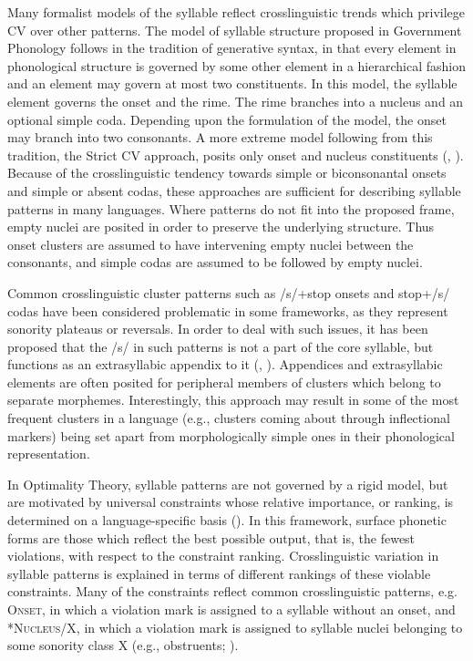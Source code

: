   Many formalist models of the syllable reflect crosslinguistic trends which privilege CV over other patterns. The model of syllable structure proposed in Government Phonology \citep{KayeEtAl1990} follows in the tradition of generative syntax, in that every element in phonological structure is governed by some other element in a hierarchical fashion and an element may govern at most two constituents. In this model, the syllable element governs the onset and the rime. The rime branches into a nucleus and an optional simple coda. Depending upon the formulation of the model, the onset may branch into two consonants. A more extreme model following from this tradition, the Strict CV approach, posits only onset and nucleus constituents (\citealt{Lowenstamm1996}, \citealt{Scheer2004}). Because of the crosslinguistic tendency towards simple or biconsonantal onsets and simple or absent codas, these approaches are sufficient for describing syllable patterns in many languages. Where patterns do not fit into the proposed frame, empty nuclei are posited in order to preserve the underlying structure. Thus onset clusters are assumed to have intervening empty nuclei between the consonants, and simple codas are assumed to be followed by empty nuclei.



  Common crosslinguistic cluster patterns such as /s/+stop onsets and stop+/s/ codas have been considered problematic in some frameworks, as they represent sonority plateaus or reversals. In order to deal with such issues, it has been proposed that the /s/ in such patterns is not a part of the core syllable, but functions as an extrasyllabic appendix to it (\citealt{VauxWolfe2009}, \citealt{Duanmu2011}). Appendices and extrasyllabic elements are often posited for peripheral members of clusters which belong to separate morphemes. Interestingly, this approach may result in some of the most frequent clusters in a language (e.g., clusters coming about through inflectional markers) being set apart from morphologically simple ones in their phonological representation.



  In Optimality Theory, syllable patterns are not governed by a rigid model, but are motivated by universal constraints whose relative importance, or ranking, is determined on a language-specific basis (\citealt{PrinceSmolensky1993}). In this framework, surface phonetic forms are those which reflect the best possible output, that is, the fewest violations, with respect to the constraint ranking. Crosslinguistic variation in syllable patterns is explained in terms of different rankings of these violable constraints. Many of the constraints reflect common crosslinguistic patterns, e.g. \textsc{Onset}, in which a violation mark is assigned to a syllable without an onset, and *\textsc{Nucleus}/X, in which a violation mark is assigned to syllable nuclei belonging to some sonority class X (e.g., obstruents; \citealt{McCarthy2008}).



